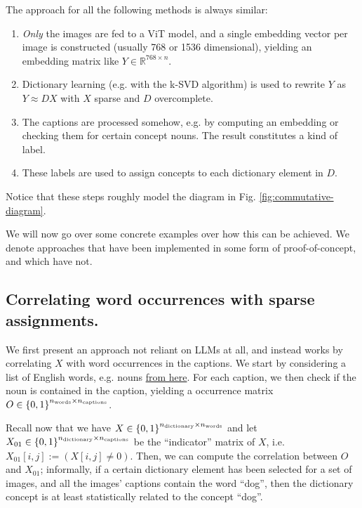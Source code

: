 \documentclass[11pt]{article}
\begin{document}
The approach for all the following methods is always similar:
\begin{enumerate}
\item \emph{Only} the images are fed to a ViT model, and a single embedding vector per image is constructed (usually 768 or 1536 dimensional), yielding an embedding matrix like \(Y \in \mathbb{R}^{768 \times n}\).
\item Dictionary learning (e.g. with the k-SVD algorithm) is used to rewrite \(Y\) as \(Y \approx D X\) with \(X\) sparse and \(D\) overcomplete.
\item The captions are processed somehow, e.g. by computing an embedding or checking them for certain concept nouns. The result constitutes a kind of label.
\item These labels are used to assign concepts to each dictionary element in \(D\).
\end{enumerate}
Notice that these steps roughly model the diagram in Fig. \ref{fig:commutative-diagram}.

We will now go over some concrete examples over how this can be achieved.
We denote approaches that have been implemented in some form of proof-of-concept, and which have not.
\subsection{Correlating word occurrences with sparse assignments. \label{subsec:computing-correlations}}
\label{sec:org9560b31}
We first present an approach not reliant on LLMs at all, and instead works by correlating \(X\) with word occurrences in the captions.
We start by considering a list of English words, e.g. nouns \href{https://github.com/hugsy/stuff/blob/main/random-word/english-nouns.txt}{from here}.
For each caption, we then check if the noun is contained in the caption, yielding a occurrence matrix \(O \in \left\{ 0, 1 \right\}^{n_{\rm words} \times n_{\rm captions}}\).

Recall now that we have \(X \in \left\{ 0, 1 \right\}^{n_{\rm dictionary} \times n_{\rm words}}\) and let \(X_{01} \in \left\{ 0,1 \right\}^{n_{\rm dictionary}\times n_{\rm captions}}\) be the ``indicator'' matrix of \(X\), i.e. \(X_{01}[i,j] := (X[i,j] \neq 0)\).
Then, we can compute the correlation between \(O\) and \(X_{01}\); informally, if a certain dictionary element has been selected for a set of images, and all the images' captions contain the word ``dog'', then the dictionary concept is at least statistically related to the concept ``dog''.
\end{document}
